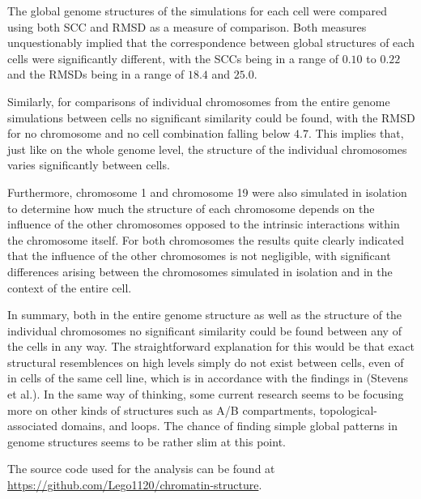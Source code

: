 The global genome structures of the simulations for each cell were compared using both SCC and RMSD as a measure of comparison. Both measures unquestionably implied that the correspondence between global structures of each cells were significantly different, with the SCCs being in a range of \(0.10\) to \(0.22\) and the RMSDs being in a range of \(18.4\) and \(25.0\).

Similarly, for comparisons of individual chromosomes from the entire genome simulations between cells no significant similarity could be found, with the RMSD for no chromosome and no cell combination falling below \(4.7\). This implies that, just like on the whole genome level, the structure of the individual chromosomes varies significantly between cells.

Furthermore, chromosome 1 and chromosome 19 were also simulated in isolation to determine how much the structure of each chromosome depends on the influence of the other chromosomes opposed to the intrinsic interactions within the chromosome itself. For both chromosomes the results quite clearly indicated that the influence of the other chromosomes is not negligible, with significant differences arising between the chromosomes simulated in isolation and in the context of the entire cell.

In summary, both in the entire genome structure as well as the structure of the individual chromosomes no significant similarity could be found between any of the cells in any way. The straightforward explanation for this would be that exact structural resemblences on high levels simply do not exist between cells, even of in cells of the same cell line, which is in accordance with the findings in (Stevens et al.\cite{stevens_3d_2017}). In the same way of thinking, some current research seems to be focusing more on other kinds of structures such as A/B compartments, topological-associated domains, and loops\cite{stevens_3d_2017}. The chance of finding simple global patterns in genome structures seems to be rather slim at this point.


\vfill

The source code used for the analysis can be found at \url{https://github.com/Lego1120/chromatin-structure}.